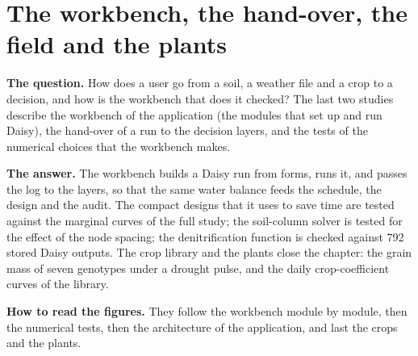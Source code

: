 \section{The workbench, the hand-over, the field and the plants}
\textbf{The question.} How does a user go from a soil, a weather file and a crop to a decision, and how is the workbench that does it checked? The last two studies describe the workbench of the application (the modules that set up and run Daisy), the hand-over of a run to the decision layers, and the tests of the numerical choices that the workbench makes.

\par\noindent\textbf{The answer.} The workbench builds a Daisy run from forms, runs it, and passes the log to the layers, so that the same water balance feeds the schedule, the design and the audit. The compact designs that it uses to save time are tested against the marginal curves of the full study; the soil-column solver is tested for the effect of the node spacing; the denitrification function is checked against 792 stored Daisy outputs. The crop library and the plants close the chapter: the grain mass of seven genotypes under a drought pulse, and the daily crop-coefficient curves of the library.

\par\noindent\textbf{How to read the figures.} They follow the workbench module by module, then the numerical tests, then the architecture of the application, and last the crops and the plants.

